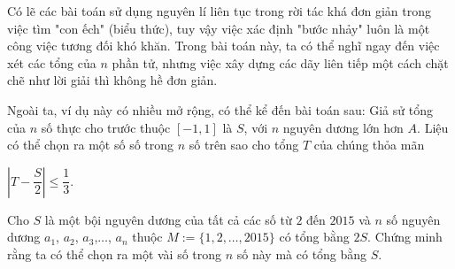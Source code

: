 \begin{nx}
	Có lẽ các bài toán sử dụng nguyên lí liên tục trong rời tác khá đơn giản trong việc tìm "con ếch" (biểu thức), tuy vậy việc xác định "bước nhảy" luôn là một công việc tương đối khó khăn. Trong bài toán này, ta có thể nghĩ ngay đến việc xét các tổng của $n$ phần tử, nhưng việc xây dựng các dãy liên tiếp một cách chặt chẽ như lời giải thì không hề đơn giản.
\end{nx}
Ngoài ta, ví dụ này có nhiều mở rộng, có thể kể đến bài toán sau: Giả sử tổng của $n$ số thực cho trước thuộc $[-1,1]$ là $S$, với $n$ nguyên dương lớn hơn $A$. Liệu có thể chọn ra một số số trong $n$ số trên sao cho tổng $T$ của chúng thỏa mãn
\begin{center}
	$\left|T-\dfrac{S}{2}\right|\leq \dfrac{1}{3}$.
\end{center}
\begin{vd}
	Cho $S$ là một bội nguyên dương của tất cả các số từ $2$ đến $2015$ và $n$ số nguyên dương $a_1$, $a_2$, $a_3$,$\ldots$, $a_n$ thuộc $M:=\{1,2,\ldots,2015\}$ có tổng bằng $2S$. Chứng minh rằng ta có thể chọn ra một vài số trong $n$ số này mà có tổng bằng $S$.
\end{vd}
